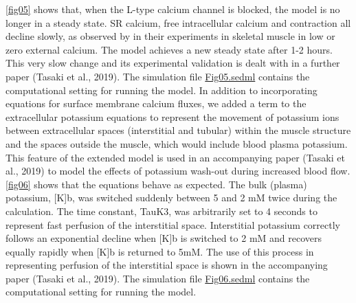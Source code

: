 \documentclass[fleqn,10pt]{physiome}
\begin{document}
\autoref{fig05} shows that, when the L-type calcium channel is blocked, the model is no longer in a steady state. SR calcium, free intracellular calcium and contraction all decline slowly, as observed by \citet{edman1964role} in their experiments in skeletal muscle in low or zero external calcium. The model achieves a new steady state after 1-2 hours. This very slow change and its experimental validation is dealt with in a further paper (Tasaki et al., 2019). The simulation file \href{https://models.physiomeproject.org/workspace/5c6/file/afd4d5cb20ecdcbc0b10198fe31795520488a34e/Fig05.sedml}{Fig05.sedml} contains the computational setting for running the model.
In addition to incorporating equations for surface membrane calcium fluxes, we added a term to the extracellular potassium equations to represent the movement of potassium ions between extracellular spaces (interstitial and tubular) within the muscle structure and the spaces outside the muscle, which would include blood plasma potassium. This feature of the extended model is used in an accompanying paper (Tasaki et al., 2019) to model the effects of potassium wash-out during increased blood flow. \autoref{fig06} shows that the equations behave as expected. The bulk (plasma) potassium, [K]b, was switched suddenly between 5 and 2 mM twice during the calculation. The time constant, TauK3, was arbitrarily set to 4 seconds to represent fast perfusion of the interstitial space. Interstitial potassium correctly follows an exponential decline when [K]b is switched to 2 mM and recovers equally rapidly when [K]b is returned to 5mM. The use of this process in representing perfusion of the interstitial space is shown in the accompanying paper (Tasaki et al., 2019). The simulation file \href{https://models.physiomeproject.org/workspace/5c6/file/afd4d5cb20ecdcbc0b10198fe31795520488a34e/Fig06.sedml}{Fig06.sedml} contains the computational setting for running the model.\newline
\end{document}
